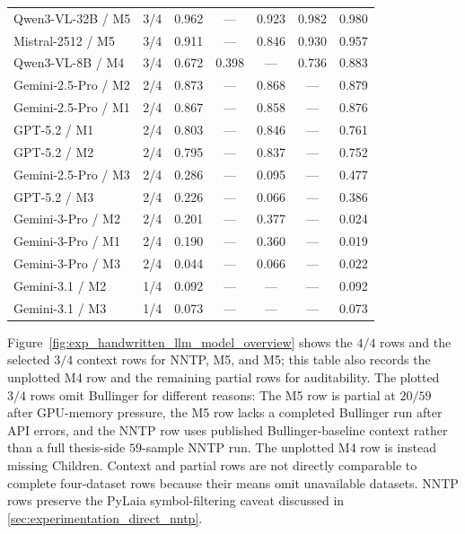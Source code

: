 \begin{landscape}
\begin{table}[p]
\begin{tabular}{@{}l c c c c c c@{}}
    Qwen3-VL-32B / M5 & 3/4 & 0.962 & --- & 0.923 & 0.982 & 0.980 \\
    Mistral-2512 / M5 & 3/4 & 0.911 & --- & 0.846 & 0.930 & 0.957 \\
    Qwen3-VL-8B / M4 & 3/4 & 0.672 & 0.398 & --- & 0.736 & 0.883 \\
    \midrule
    Gemini-2.5-Pro / M2 & 2/4 & 0.873 & --- & 0.868 & --- & 0.879 \\
    Gemini-2.5-Pro / M1 & 2/4 & 0.867 & --- & 0.858 & --- & 0.876 \\
    GPT-5.2 / M1 & 2/4 & 0.803 & --- & 0.846 & --- & 0.761 \\
    GPT-5.2 / M2 & 2/4 & 0.795 & --- & 0.837 & --- & 0.752 \\
    Gemini-2.5-Pro / M3 & 2/4 & 0.286 & --- & 0.095 & --- & 0.477 \\
    GPT-5.2 / M3 & 2/4 & 0.226 & --- & 0.066 & --- & 0.386 \\
    Gemini-3-Pro / M2 & 2/4 & 0.201 & --- & 0.377 & --- & 0.024 \\
    Gemini-3-Pro / M1 & 2/4 & 0.190 & --- & 0.360 & --- & 0.019 \\
    Gemini-3-Pro / M3 & 2/4 & 0.044 & --- & 0.066 & --- & 0.022 \\
    Gemini-3.1 / M2 & 1/4 & 0.092 & --- & --- & --- & 0.092 \\
    Gemini-3.1 / M3 & 1/4 & 0.073 & --- & --- & --- & 0.073 \\
    \bottomrule
  \end{tabular}
  \vspace{0.35em}

  \parbox{0.96\linewidth}{\footnotesize\raggedright Figure~\ref{fig:exp_handwritten_llm_model_overview} shows the \(4/4\) rows and the selected \(3/4\) context rows for NNTP, \QwenThirtyTwoShort{} M5, and \MistralLargeShort{} M5; this table also records the unplotted \QwenEightShort{} M4 row and the remaining partial rows for auditability. The plotted \(3/4\) rows omit Bullinger for different reasons: The \QwenThirtyTwoShort{} M5 row is partial at \(20/59\) after GPU-memory pressure, the \MistralLargeShort{} M5 row lacks a completed Bullinger run after API errors, and the NNTP row uses published Bullinger-baseline context rather than a full thesis-side \(59\)-sample NNTP run. The unplotted \QwenEightShort{} M4 row is instead missing Children. Context and partial rows are not directly comparable to complete four-dataset rows because their means omit unavailable datasets. NNTP rows preserve the PyLaia symbol-filtering caveat discussed in \autoref{sec:experimentation_direct_nntp}.}
\end{table}
\end{landscape}

